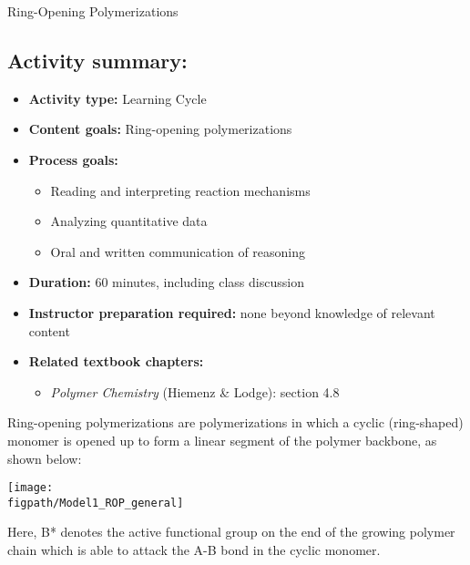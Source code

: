 \begin{activity}{Ring-Opening Polymerizations}
\begin{instructornotes}
	\subsection*{Activity summary:}
	\begin{itemize}
		\item \textbf{Activity type:} Learning Cycle
		\item \textbf{Content goals:} Ring-opening polymerizations
		\item \textbf{Process goals:} %
			\begin{itemize}
				\item Reading and interpreting reaction mechanisms
				\item Analyzing quantitative data
				\item Oral and written communication of reasoning
			\end{itemize}
		\item \textbf{Duration:} 60 minutes, including class discussion
		\item \textbf{Instructor preparation required:} none beyond knowledge of relevant content
		\item \textbf{Related textbook chapters:}
			\begin{itemize}
				\item \emph{Polymer Chemistry} (Hiemenz \& Lodge): section 4.8
			\end{itemize}
	\end{itemize}
	
\end{instructornotes}


\begin{model}
	\label{\labelbase:mdl:ROP}

	Ring-opening polymerizations are polymerizations in which a cyclic (ring-shaped) monomer is opened up to form a linear segment of the polymer backbone, as shown below:
	
	\centerline{\texttt{[image: \\figpath/Model1\_ROP\_general]}}
	
	Here, B* denotes the active functional group on the end of the growing polymer chain which is able to attack the A-B bond in the cyclic monomer.
	

\end{model}
\end{activity}
